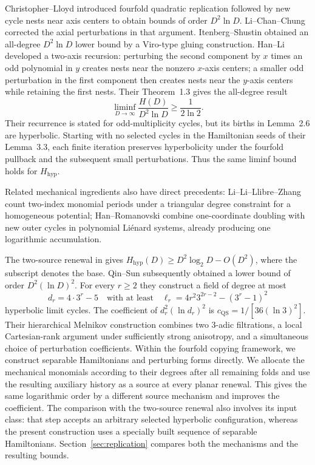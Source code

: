 \documentclass[11pt]{article}
\numberwithin{equation}{section}
\theoremstyle{definition}
\theoremstyle{remark}
\newcommand{\Hhyp}{H_{\mathrm{hyp}}}
\begin{document}
Christopher--Lloyd \cite[Section~3]{ChristopherLloyd1995} introduced
fourfold quadratic replication followed by new cycle nests near axis
centers to obtain bounds of order $D^2\ln D$. Li--Chan--Chung
\cite[Section~3, Remark~4 and Proposition~5]{LiChanChung2002}
corrected the axial perturbations in that argument. Itenberg--Shustin
\cite[Theorem~2.1]{ItenbergShustin2000} obtained an all-degree
$D^2\ln D$ lower bound by a Viro-type gluing construction. Han--Li
\cite[Lemma~2.6 and Theorem~2.1]{HanLi2012} developed a two-axis
recursion: perturbing the second component by $x$ times an odd
polynomial in $y$ creates nests near the nonzero $x$-axis centers;
a smaller odd perturbation in the first component then creates nests
near the $y$-axis centers while retaining the first nests. Their
Theorem~1.3 gives the all-degree result
\[
 \liminf_{D\to\infty}\frac{H(D)}{D^2\ln D}\ge\frac1{2\ln2}.
\]
Their recurrence is stated for odd-multiplicity cycles, but its births
in Lemma~2.6 are hyperbolic. Starting with no selected cycles in the
Hamiltonian seeds of their Lemma~3.3, each finite iteration preserves
hyperbolicity under the fourfold pullback and the subsequent small
perturbations. Thus the same liminf bound holds for $\Hhyp$.

Related mechanical ingredients also have direct precedents:
Li--Li--Llibre--Zhang
\cite[p.~445]{LiLiLlibreZhang2001} count two-index monomial periods
under a triangular degree constraint for a homogeneous potential;
Han--Romanovski \cite[Theorems~2.1 and 3.2]{HanRomanovski2011} combine
one-coordinate doubling with new outer cycles in polynomial
Li\'enard systems, already producing one logarithmic accumulation.

The two-source renewal in \cite{Lu2026} gives
$\Hhyp(D)\ge D^2\log_2D-O(D^2)$, where the subscript denotes the base.
Qin--Sun \cite[Theorem~1.1 and Section~6.2]{QinSun2026} subsequently obtained a lower
bound of order $D^2(\ln D)^2$. For every
$r\ge2$ they construct a field of degree at most
\begin{equation}\label{eq:QS}
 d_r=4\cdot3^r-5
 \quad\text{with at least}\quad
 \ell_r=4r^2 3^{2r-2}-(3^r-1)^2
\end{equation}
hyperbolic limit cycles. The coefficient of $d_r^2(\ln d_r)^2$ is
$c_{\mathrm{QS}}=1/[36(\ln3)^2]$. Their hierarchical Melnikov construction combines two
3-adic filtrations, a local Cartesian-rank argument under sufficiently
strong anisotropy, and a simultaneous choice of perturbation coefficients.
Within the fourfold copying framework, we construct separable Hamiltonians
and perturbing forms directly. We allocate the mechanical monomials
according to their degrees after all remaining folds and use the resulting
auxiliary history as a source at every planar renewal.
This gives the same logarithmic order by a different source mechanism
and improves the coefficient. The comparison with the two-source renewal
also involves its input class: that step accepts an arbitrary selected
hyperbolic configuration, whereas the present construction uses a
specially built sequence of separable Hamiltonians. Section~\ref{sec:replication}
compares both the mechanisms and the resulting bounds.
\end{document}
